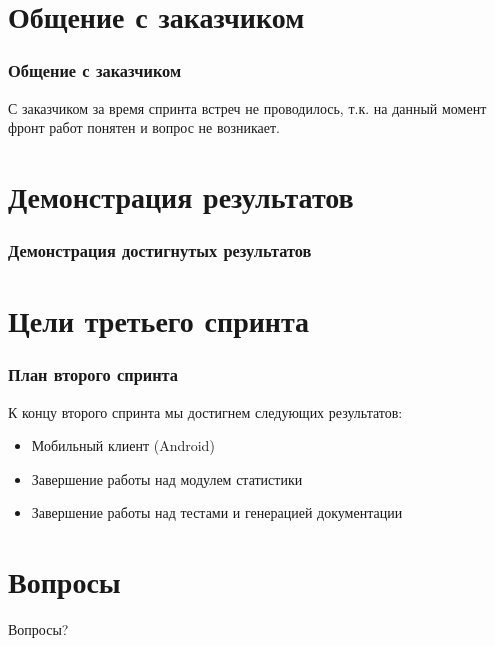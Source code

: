 \documentclass{beamer}
\newlength{\wideitemsep}
\let\olditem\item
\renewcommand{\item}{\setlength{\itemsep}{\wideitemsep}\olditem}
\begin{document}
\section{Общение с заказчиком}

\begin{frame}
\frametitle{Общение с заказчиком}

С заказчиком за время спринта встреч не проводилось, т.к. на данный момент фронт работ понятен и вопрос не возникает.

\end{frame}

\section{Демонстрация результатов}

\begin{frame}
\frametitle{Демонстрация достигнутых результатов}



\end{frame}

\section{Цели третьего спринта}

\begin{frame}
\frametitle{План второго спринта}

К концу второго спринта мы достигнем следующих результатов:
\medskip
\begin{itemize}
\item Мобильный клиент (Android)
\item Завершение работы над модулем статистики
\item Завершение работы над тестами и генерацией документации
\end{itemize}

\end{frame}

\section{Вопросы}

\begin{frame}
\Huge{\centerline{Вопросы?}}
\end{frame}

\end{document}

